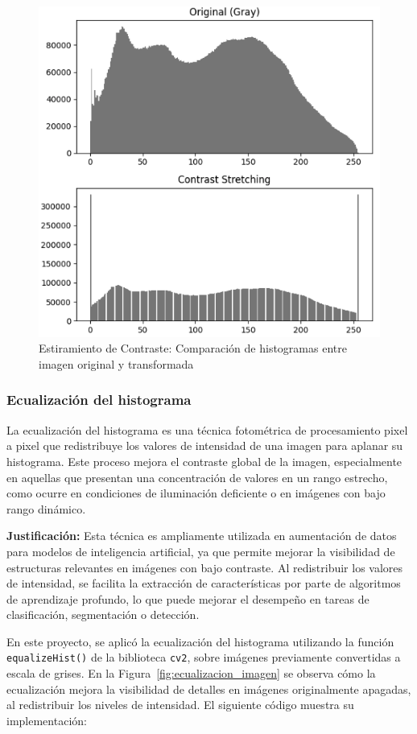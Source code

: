 \documentclass[12pt,letterpaper]{article}
\begin{document}
\begin{figure}[H]
  \centering
  \includegraphics[width=0.8\linewidth]{figuras/estiramiento_de_contraste_justificacion.png}
  \caption{Estiramiento de Contraste: Comparación de histogramas entre imagen original y transformada}
  \label{fig:estiramiento_de_contraste_justificacion}
\end{figure}


\subsubsection{Ecualización del histograma}
La ecualización del histograma es una técnica fotométrica de procesamiento pixel a pixel que redistribuye los valores de intensidad de una imagen para aplanar su histograma. Este proceso mejora el contraste global de la imagen, especialmente en aquellas que presentan una concentración de valores en un rango estrecho, como ocurre en condiciones de iluminación deficiente o en imágenes con bajo rango dinámico.

\textbf{Justificación:} Esta técnica es ampliamente utilizada en aumentación de datos para modelos de inteligencia artificial, ya que permite mejorar la visibilidad de estructuras relevantes en imágenes con bajo contraste. Al redistribuir los valores de intensidad, se facilita la extracción de características por parte de algoritmos de aprendizaje profundo, lo que puede mejorar el desempeño en tareas de clasificación, segmentación o detección.

En este proyecto, se aplicó la ecualización del histograma utilizando la función \texttt{equalizeHist()} de la biblioteca \texttt{cv2}, sobre imágenes previamente convertidas a escala de grises. En la Figura~\ref{fig:ecualizacion_imagen} se observa cómo la ecualización mejora la visibilidad de detalles en imágenes originalmente apagadas, al redistribuir los niveles de intensidad. El siguiente código muestra su implementación:
\end{document}
